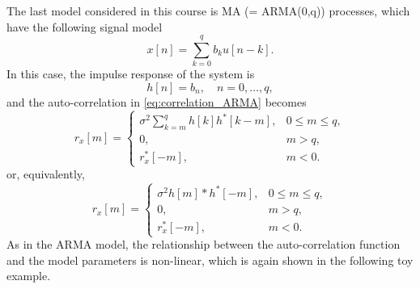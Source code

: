 The last model considered in this course is MA (= ARMA(0,q)) processes, which have the following signal model
\begin{equation*}
x[n]  = \sum_{k = 0}^{q} b_k u[n-k].
\end{equation*}
In this case, the impulse response of the system is
\begin{equation*}
h[n] = b_n, \quad n = 0, \ldots, q,
\end{equation*}
and the auto-correlation in \eqref{eq:correlation_ARMA} becomes
\begin{equation*}
r_{x}[m] = \begin{cases}
\displaystyle \sigma^2  \sum_{k = m}^{q} h[k]  h^{\ast}[k-m], & 0 \leq  m \leq q, \\ 
0, & m > q, \\
r_{x}^{\ast}[-m], & m < 0.
\end{cases}
\end{equation*}
or, equivalently,
\begin{equation*}
r_{x}[m] = \begin{cases}
\displaystyle \sigma^2  h[m] \ast  h^{\ast}[-m], & 0 \leq  m \leq q, \\ 
0, & m > q, \\
r_{x}^{\ast}[-m], & m < 0.
\end{cases}
\end{equation*}
As in the ARMA model, the relationship between the auto-correlation function and the model parameters is non-linear, which is again shown in the following toy example.

